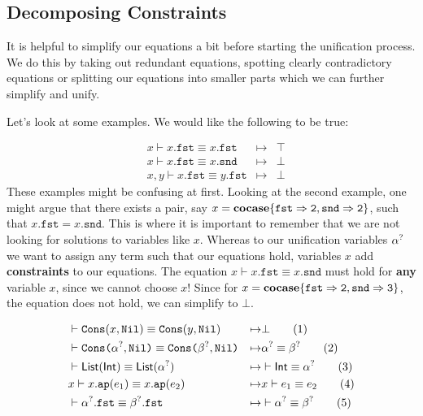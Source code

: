\documentclass[twoside,12pt,a4paper]{article}
\begin{document}
\subsection{Decomposing Constraints}

It is helpful to simplify our equations a bit before starting the unification process.
We do this by taking out redundant equations, spotting clearly contradictory equations or splitting our equations into smaller parts which we can further simplify and unify.

Let's look at some examples. We would like the following to be true:
\begin{example}
    \begin{align*}
    &x \vdash x.\mathtt{fst} \equiv x.\mathtt{fst} &\mapsto& \top
    \tag{1}\\
    &x \vdash x.\mathtt{fst} \equiv x.\mathtt{snd} &\mapsto& \bot 
    \tag{2}\\
    &x,y \vdash x.\mathtt{fst} \equiv y.\mathtt{fst} &\mapsto& \bot 
    \tag{3}
    \end{align*}
    These examples might be confusing at first. Looking at the second example, one might argue that there exists a pair, say $x = \textbf{cocase}\{\mathtt{fst\Rightarrow 2, snd\Rightarrow 2}\}$, such that
    $x.\mathtt{fst} = x.\mathtt{snd}$. This is where it is important to remember that we are not looking for solutions to variables like $x$.
    Whereas to our unification variables $\alpha^?$ we want to assign any term such that our equations hold, variables $x$ add \textbf{constraints} to our equations. 
    The equation $x \vdash x.\mathtt{fst} \equiv x.\mathtt{snd}$ must hold for \textbf{any} variable $x$, since we cannot choose $x$! 
    Since for $x = \textbf{cocase}\{\mathtt{fst\Rightarrow 2, snd\Rightarrow 3}\}$, the equation does not hold, we can simplify to $\bot$.
\end{example}

\begin{example}
    \begin{align*}
    &\vdash \mathtt{Cons(}x, \mathtt{Nil}\mathtt{)} \equiv \mathtt{Cons(}y, \mathtt{Nil}\mathtt{)}&\mapsto& \bot
    \tag{1}\\
    &\vdash \texttt{Cons(}\alpha^?, \texttt{Nil)}\equiv\texttt{Cons(}\beta^?, \texttt{Nil)}
    &\mapsto&\alpha^?\equiv \beta^?
    \tag{2}\\
    &\vdash \mathsf{List(Int)}\equiv \mathsf{List(\alpha^?)}
    &\mapsto& \vdash \mathsf{Int}\equiv \alpha^?
    \tag{3}\\
    &x \vdash x.\texttt{ap}(e_1)\equiv x.\texttt{ap}(e_2) &\mapsto& x\vdash e_1\equiv e_2 
    \tag{4}\\
    &\vdash\mathtt{\alpha^?.fst \equiv \beta^?.fst}&\mapsto& \vdash\alpha^?\equiv \beta^?
    \tag{5}
    \end{align*}
\end{example}
\end{document}
